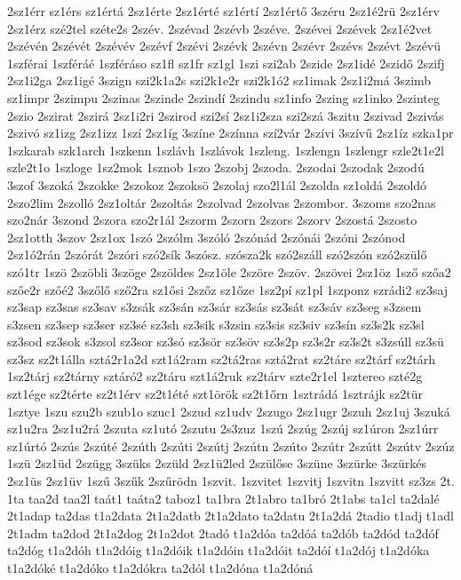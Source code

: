 {2sz1érr
sz1érs
sz1értá
2sz1érte
2sz1érté
sz1értí
2sz1értő
3széru
2sz1é2rü
2sz1érv
2sz1érz
szé2tel
széte2s
2szév.
2szévad
2szévb
2széve.
2szévei
2szévek
2sz1é2vet
2szévén
2szévét
2szévév
2szévf
2szévi
2szévk
2szévn
2szévr
2szévs
2szévt
2szévü
1szférai
1szféráé
1szféráso
sz1fl
sz1fr
sz1gl
1szi
szi2ab
2szide
2sz1idé
2szidő
2szifj
2sz1i2ga
2sz1igé
3szign
szi2k1a2s
szi2k1e2r
szi2k1ó2
sz1imak
2sz1i2má
3szimb
sz1impr
2szimpu
2szinas
2szinde
2szindí
2szindu
sz1info
2szing
sz1inko
2szinteg
2szio
2szirat
2szirá
2sz1i2ri
2szirod
szi2sí
2sz1i2sza
szi2szá
3szitu
2szivad
2szivás
2szivó
sz1izg
2sz1izz
1szí
2sz1íg
3színe
2színna
szí2vár
2szívi
3szívű
2sz1íz
szka1pr
1szkarab
szk1arch
1szkenn
1szlávh
1szlávok
1szleng.
1szlengn
1szlengr
szle2t1e2l
szle2t1o
1szloge
1sz2mok
1sznob
1szo
2szobj
2szoda.
2szodai
2szodak
2szodú
3szof
3szoká
2szokke
2szokoz
2szoksö
2szolaj
szo2l1ál
2szolda
sz1oldá
2szoldó
2szo2lim
2szolló
2sz1oltár
2szoltás
2szolvad
2szolvas
2szombor.
3szoms
szo2nas
szo2nár
3szond
2szora
szo2r1ál
2szorm
2szorn
2szors
2szorv
2szostá
2szosto
2sz1otth
3szov
2sz1ox
1szó
2szólm
3szóló
2szónád
2szónái
2szóni
2szónod
2sz1ó2rán
2szórát
2szóri
szó2sík
3szósz.
szósza2k
szó2száll
szó2szón
szó2szülő
szó1tr
1szö
2szöbli
3szöge
2szöldes
2sz1öle
2szöre
2szöv.
2szövei
2sz1öz
1sző
szőa2
szőe2r
szőé2
3szőlő
sző2ra
sz1ősi
2szőz
sz1őze
1sz2pí
sz1pl
1szponz
szrádi2
sz3saj
sz3sap
sz3sas
sz3sav
s3zsák
sz3sán
sz3sár
sz3sás
sz3sát
sz3sáv
sz3seg
s3zsem
s3zsen
sz3sep
sz3ser
sz3sé
sz3sh
sz3sik
s3zsin
sz3sis
sz3siv
sz3sín
sz3s2k
sz3sl
sz3sod
sz3sok
s3zsol
sz3sor
sz3só
sz3sör
sz3söv
sz3s2p
sz3s2r
sz3s2t
s3zsúll
sz3sü
sz3sz
sz2t1álla
sztá2r1a2d
szt1á2ram
sz2tá2ras
sztá2rat
sz2táre
sz2tárf
sz2tárh
1sz2tárj
sz2tárny
sztáró2
sz2táru
szt1á2ruk
sz2tárv
szte2r1el
1sztereo
szté2g
szt1ége
sz2térte
sz2t1érv
sz2t1été
szt1örök
sz2t1őrn
1sztrádá
1sztrájk
sz2tür
1sztye
1szu
szu2b
szub1o
szuc1
2szud
sz1udv
2szugo
2sz1ugr
2szuh
2sz1uj
3szuká
sz1u2ra
2sz1u2rá
2szuta
sz1utó
2szutu
2s3zuz
1szú
2szúg
2szúj
sz1úron
2sz1úrr
sz1úrtó
2szús
2szúté
2szúth
2szúti
2szútj
2szútn
2szúto
2szútr
2szútt
2szútv
2szúz
1szü
2sz1üd
2szügg
3szüks
2szüld
2sz1ü2led
2szülőse
3szüne
3szürke
3szürkés
2sz1üs
2sz1üv
1szű
3szűk
2szűrödn
1szvit.
1szvitet
1szvitj
1szvitn
1szvitt
sz3zs
2t.
1ta
taa2d
taa2l
taát1
taáta2
taboz1
ta1bra
2t1abro
ta1bró
2t1abs
ta1cl
ta2dalé
2t1adap
ta2das
t1a2data
2t1a2datb
2t1a2dato
ta2datu
2t1a2dá
2tadio
t1adj
t1adl
2t1adm
ta2dod
2t1a2dog
2t1a2dot
2tadó
t1a2dóa
ta2dóá
ta2dób
ta2dód
ta2dóf
ta2dóg
t1a2dóh
t1a2dóig
t1a2dóik
t1a2dóin
t1a2dóit
ta2dóí
t1a2dój
t1a2dóka
t1a2dóké
t1a2dóko
t1a2dókra
ta2dól
t1a2dóna
t1a2dóná
}

